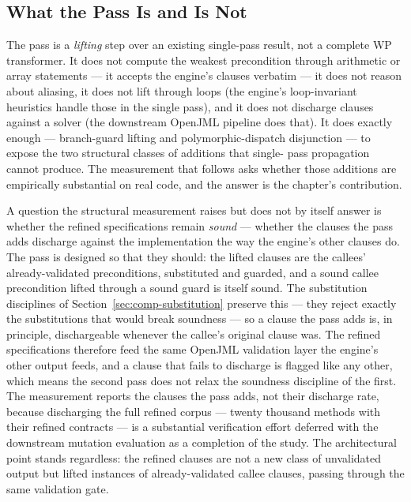 \subsection{What the Pass Is and Is Not}

The pass is a \emph{lifting} step over an existing single-pass result, not a
complete WP transformer. It does not compute the weakest precondition through
arithmetic or array statements --- it accepts the engine's clauses verbatim ---
it does not reason about aliasing, it does not lift through loops (the engine's
loop-invariant heuristics handle those in the single pass), and it does not
discharge clauses against a solver (the downstream OpenJML pipeline does that).
It does exactly enough --- branch-guard lifting and polymorphic-dispatch
disjunction --- to expose the two structural classes of additions that single-
pass propagation cannot produce. The measurement that follows asks whether those
additions are empirically substantial on real code, and the answer is the
chapter's contribution.

A question the structural measurement raises but does not by itself answer is
whether the refined specifications remain \emph{sound} --- whether the clauses the
pass adds discharge against the implementation the way the engine's other clauses
do. The pass is designed so that they should: the lifted clauses are the callees'
already-validated preconditions, substituted and guarded, and a sound callee
precondition lifted through a sound guard is itself sound. The substitution
disciplines of Section~\ref{sec:comp-substitution} preserve this --- they reject
exactly the substitutions that would break soundness --- so a clause the pass adds
is, in principle, dischargeable whenever the callee's original clause was. The
refined specifications therefore feed the same OpenJML validation layer the
engine's other output feeds, and a clause that fails to discharge is flagged like
any other, which means the second pass does not relax the soundness discipline of
the first. The measurement reports the clauses the pass adds, not their discharge
rate, because discharging the full refined corpus --- twenty thousand methods with
their refined contracts --- is a substantial verification effort deferred with the
downstream mutation evaluation as a completion of the study. The architectural
point stands regardless: the refined clauses are not a new class of unvalidated
output but lifted instances of already-validated callee clauses, passing through the
same validation gate.

